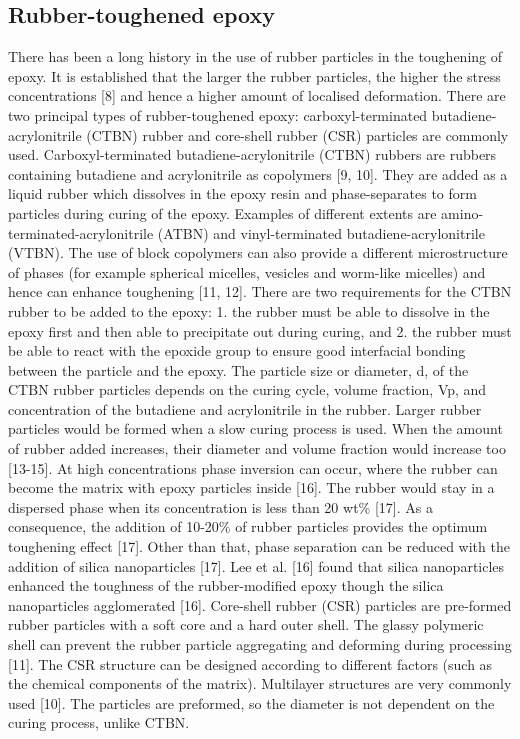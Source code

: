 \documentclass[numbers=noendperiod,chapterprefix=on]{icldt} %
\begin{document}
\subsection{Rubber-toughened epoxy}
There has been a long history in the use of rubber particles in the toughening of epoxy. It is established that the larger the rubber particles, the higher the stress concentrations [8] and hence a higher amount of localised deformation. There are two principal types of rubber-toughened epoxy: carboxyl-terminated butadiene-acrylonitrile (CTBN) rubber and core-shell rubber (CSR) particles are commonly used. 
Carboxyl-terminated butadiene-acrylonitrile (CTBN) rubbers are rubbers containing butadiene and acrylonitrile as copolymers [9, 10]. They are added as a liquid rubber which dissolves in the epoxy resin and phase-separates to form particles during curing of the epoxy. Examples of different extents are amino-terminated-acrylonitrile (ATBN) and vinyl-terminated butadiene-acrylonitrile (VTBN). The use of block copolymers can also provide a different microstructure of phases (for example spherical micelles, vesicles and worm-like micelles) and hence can enhance toughening [11, 12]. 
There are two requirements for the CTBN rubber to be added to the epoxy: 1. the rubber must be able to dissolve in the epoxy first and then able to precipitate out during curing, and 2. the rubber must be able to react with the epoxide group to ensure good interfacial bonding between the particle and the epoxy. The particle size or diameter, d, of the CTBN rubber particles depends on the curing cycle, volume fraction, Vp, and concentration of the butadiene and acrylonitrile in the rubber. Larger rubber particles would be formed when a slow curing process is used. When the amount of rubber added increases, their diameter and volume fraction would increase too [13-15].
At high concentrations phase inversion can occur, where the rubber can become the matrix with epoxy particles inside [16]. The rubber would stay in a dispersed phase when its concentration is less than 20 wt\% [17]. As a consequence, the addition of 10-20\% of rubber particles provides the optimum toughening effect [17]. Other than that, phase separation can be reduced with the addition of silica nanoparticles [17]. Lee et al. [16] found that silica nanoparticles enhanced the toughness of the rubber-modified epoxy though the silica nanoparticles agglomerated [16]. 
Core-shell rubber (CSR) particles are pre-formed rubber particles with a soft core and a hard outer shell. The glassy polymeric shell can prevent the rubber particle aggregating and deforming during processing [11]. The CSR structure can be designed according to different factors (such as the chemical components of the matrix). Multilayer structures are very commonly used [10]. The particles are preformed, so the diameter is not dependent on the curing process, unlike CTBN. 
\end{document}
